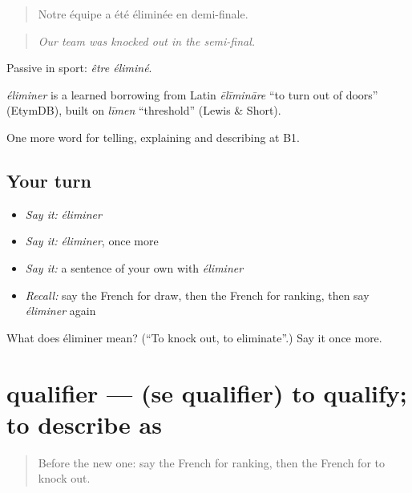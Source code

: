 \begin{quote}
Notre équipe a été éliminée en demi-finale.
\end{quote}

\begin{quote}
\emph{Our team was knocked out in the semi-final.}
\end{quote}

Passive in sport: \emph{être éliminé}.

\begin{cousinweb}
\emph{éliminer} is a learned borrowing from Latin \emph{ēlīmināre} \textquotedblleft{}to turn out of doors\textquotedblright{} (EtymDB), built on \emph{līmen} \textquotedblleft{}threshold\textquotedblright{} (Lewis \& Short).
\end{cousinweb}

\begin{grammarlens}[title={What you've built}]
One more word for telling, explaining and describing at B1.
\end{grammarlens}

\subsection*{Your turn}
\begin{itemize}
\raggedright
  \item \emph{Say it:} \emph{éliminer}
  \item \emph{Say it:} \emph{éliminer}, once more
  \item \emph{Say it:} a sentence of your own with \emph{éliminer}
  \item \emph{Recall:} say the French for draw, then the French for ranking, then say \emph{éliminer} again
\end{itemize}

\begin{tcolorbox}[breakable,colback=teal!4,colframe=teal!35!black,title={Before you move on}]
What does éliminer mean? (\textquotedblleft{}To knock out, to eliminate\textquotedblright{}.) Say it once more.
\end{tcolorbox}
\section[qualifier]{qualifier — (se qualifier) to qualify; to describe as}

\label{lesson:FR-C506-qualifier}



\begin{quote}
Before the new one: say the French for ranking, then the French for to knock out.
\end{quote}

